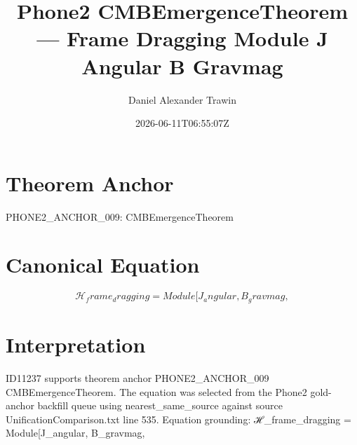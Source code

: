 \documentclass[11pt]{article}
\title{Phone2 CMBEmergenceTheorem — Frame Dragging Module J Angular B Gravmag}
\author{Daniel Alexander Trawin}
\date{2026-06-11T06:55:07Z}
\begin{document}
\maketitle
\section*{Theorem Anchor}
PHONE2_ANCHOR_009: CMBEmergenceTheorem
\section*{Canonical Equation}
\[
ℋ_frame_dragging = Module[{J_angular, B_gravmag},
\]
\section*{Interpretation}
ID11237 supports theorem anchor PHONE2_ANCHOR_009 CMBEmergenceTheorem. The equation was selected from the Phone2 gold-anchor backfill queue using nearest_same_source against source UnificationComparison.txt line 535. Equation grounding: ℋ_frame_dragging = Module[{J_angular, B_gravmag},
\end{document}
